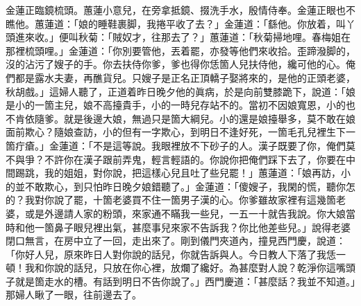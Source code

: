 金蓮正臨鏡梳頭。蕙蓮小意兒，在旁拿抵鏡、掇洗手水，殷情侍奉。金蓮正眼也不瞧他。蕙蓮道：「娘的睡鞋裹脚，我捲平收了去？」金蓮道：「繇他。你放着，叫丫頭進來收。」便叫秋菊：「賊奴才，往那去了？」蕙蓮道：「秋菊掃地哩。春梅姐在那裡梳頭哩。」金蓮道：「你別要管他，丟着罷，亦發等他們來收拾。歪蹄潑脚的，沒的沾污了嫂子的手。你去扶侍你爹，爹也得你恁箇人兒扶侍他，纔可他的心。俺們都是露水夫妻，再醮貨兒。只嫂子是正名正頂轎子娶將來的，是他的正頭老婆，秋胡戲。」這婦人聽了，正道着昨日晚夕他的眞病，於是向前雙膝跪下，說道：「娘是小的一箇主兒，娘不高擡貴手，小的一時兒存站不的。當初不因娘寬恩，小的也不肯依隨爹。就是後邊大娘，無過只是箇大綱兒。小的還是娘擡舉多，莫不敢在娘面前欺心？隨娘查訪，小的但有一字欺心，到明日不逢好死，一箇毛孔兒裡生下一箇疔瘡。」{}金蓮道：「不是這等說。我眼裡放不下砂子的人。漢子既要了你，俺們莫不與爭？不許你在漢子跟前弄鬼，輕言輕語的。你說你把俺們踩下去了，你要在中間踢跳，我的姐姐，對你說，把這樣心兒且吐了些兒罷！」蕙蓮道：「娘再訪，小的並不敢欺心，到只怕昨日晚夕娘錯聽了。」金蓮道：「傻嫂子，我閑的慌，聽你怎的？我對你說了罷，十箇老婆買不住一箇男子漢的心。你爹雖故家裡有這幾箇老婆，或是外邊請人家的粉頭，來家通不瞞我一些兒，一五一十就告我說。{}你大娘當時和他一箇鼻子眼兒裡出氣，甚麼事兒來家不告訴我？你比他差些兒。」說得老婆閉口無言，在房中立了一回，走出來了。剛到儀門夾道內，撞見西門慶，說道：「你好人兒，原來昨日人對你說的話兒，你就告訴與人。{}今日教人下落了我恁一頓！我和你說的話兒，只放在你心裡，放爛了纔好。為甚麼對人說？乾淨你這嘴頭子就是箇走水的槽。有話到明日不告你說了。」西門慶道：「甚麼話？我並不知道。」{}那婦人瞅了一眼，往前邊去了。

